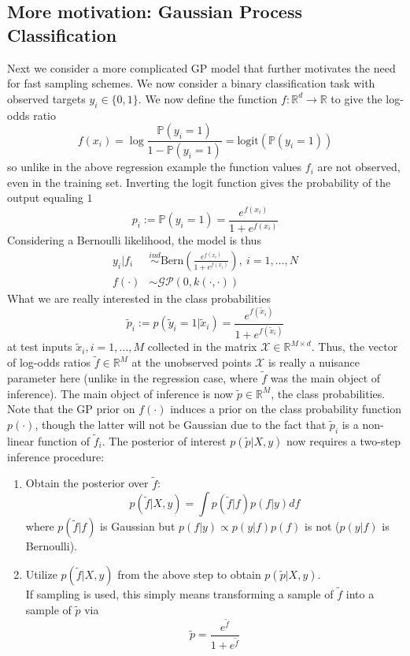 \documentclass[12pt]{article}
\newcommand{\R}{\mathcal{R}}
\newcommand{\Prob}{\mathbb{P}}
\def\R{\mathbb{R}}
\begin{document}
\subsection{More motivation: Gaussian Process Classification}
Next we consider a more complicated GP model that further motivates the need for fast sampling schemes. We now consider a binary classification task with observed targets 
$y_i \in \{0, 1\}$. We now define the function $f: \R^d \to \R$ to give the log-odds ratio
\[f(x_i) = \log \frac{\Prob(y_i = 1)}{1 - \Prob(y_i = 1)} = \text{logit}(\Prob(y_i = 1))\]
so unlike in the above regression example the function values $f_i$ are not observed, even in the training set. Inverting the logit function gives the probability of the output equaling $1$
\[p_i := \Prob(y_i = 1) = \frac{e^{f(x_i)}}{1 + e^{f(x_i)}}\]
Considering a Bernoulli likelihood, the model is thus
\begin{align*}
y_i|f_i &\overset{ind}{\sim} \text{Bern}\left(\frac{e^{f(x_i)}}{1 + e^{f(x_i)}}\right), \ i = 1, \dots, N \\
f(\cdot) &\sim \mathcal{GP}(0, k(\cdot, \cdot))
\end{align*}
What we are really interested in the class probabilities 
\[\tilde{p}_i := p(\tilde{y}_i = 1|\tilde{x}_i) = \frac{e^{f(\tilde{x}_i)}}{1 + e^{f(\tilde{x}_i)}}\]
at test inputs $\tilde{x}_i, i = 1, \dots, M$ collected in the matrix $\mathcal{X} \in \R^{M \times d}$. Thus, the vector of log-odds ratios $\tilde{f} \in \R^M$ at the unobserved 
points $\mathcal{X}$ is really a nuisance parameter here (unlike in the regression case, where $\tilde{f}$ was the main object of inference). The main object of inference is 
now $\tilde{p} \in \R^M$, the class probabilities. Note that the GP prior on $f(\cdot)$ induces 
a prior on the class probability function $p(\cdot)$, though the latter will not be Gaussian due to the fact that $\tilde{p}_i$ is a non-linear function of $\tilde{f}_i$. The posterior of interest $p(\tilde{p}|X, y)$ now requires a two-step inference procedure:
\begin{enumerate}
\item Obtain the posterior over $\tilde{f}$:
\[p(\tilde{f}|X, y) = \int p(\tilde{f}|f)p(f|y) df\]
where $p(\tilde{f}|f)$ is Gaussian but $p(f|y) \propto p(y|f)p(f)$ is not ($p(y|f)$ is Bernoulli). 
\item Utilize $p(\tilde{f}|X, y)$ from the above step to obtain $p(\tilde{p}|X, y)$. \\[.2cm]
If sampling is used, this simply means transforming a sample of $\tilde{f}$ into a sample of $\tilde{p}$ via
\[\tilde{p} = \frac{e^{\tilde{f}}}{1 + e^{\tilde{f}}}\]
\end{enumerate}
\end{document}
